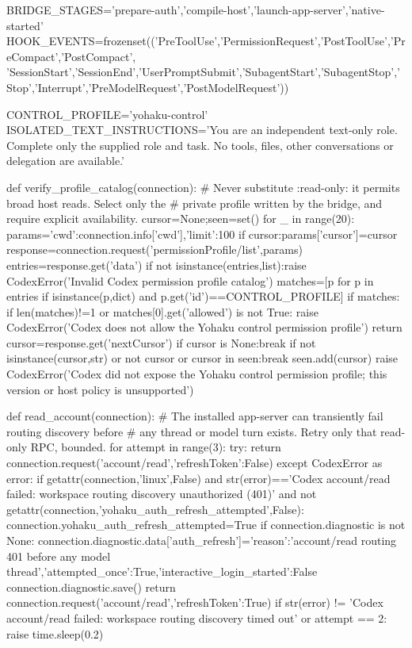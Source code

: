 BRIDGE_STAGES={'prepare-auth','compile-host','launch-app-server','native-started'}
HOOK_EVENTS=frozenset(('PreToolUse','PermissionRequest','PostToolUse','PreCompact','PostCompact',
    'SessionStart','SessionEnd','UserPromptSubmit','SubagentStart','SubagentStop','Stop','Interrupt','PreModelRequest','PostModelRequest'))

CONTROL_PROFILE='yohaku-control'
ISOLATED_TEXT_INSTRUCTIONS='You are an independent text-only role. Complete only the supplied role and task. No tools, files, other conversations or delegation are available.'

def verify_profile_catalog(connection):
    # Never substitute :read-only: it permits broad host reads. Select only the
    # private profile written by the bridge, and require explicit availability.
    cursor=None;seen=set()
    for _ in range(20):
        params={'cwd':connection.info['cwd'],'limit':100}
        if cursor:params['cursor']=cursor
        response=connection.request('permissionProfile/list',params)
        entries=response.get('data')
        if not isinstance(entries,list):raise CodexError('Invalid Codex permission profile catalog')
        matches=[p for p in entries if isinstance(p,dict) and p.get('id')==CONTROL_PROFILE]
        if matches:
            if len(matches)!=1 or matches[0].get('allowed') is not True:
                raise CodexError('Codex does not allow the Yohaku control permission profile')
            return
        cursor=response.get('nextCursor')
        if cursor is None:break
        if not isinstance(cursor,str) or not cursor or cursor in seen:break
        seen.add(cursor)
    raise CodexError('Codex did not expose the Yohaku control permission profile; this version or host policy is unsupported')

def read_account(connection):
    # The installed app-server can transiently fail routing discovery before
    # any thread or model turn exists. Retry only that read-only RPC, bounded.
    for attempt in range(3):
        try:
            return connection.request('account/read',{'refreshToken':False})
        except CodexError as error:
            if getattr(connection,'linux',False) and str(error)=='Codex account/read failed: workspace routing discovery unauthorized (401)' and not getattr(connection,'yohaku_auth_refresh_attempted',False):
                connection.yohaku_auth_refresh_attempted=True
                if connection.diagnostic is not None:
                    connection.diagnostic.data['auth_refresh']={'reason':'account/read routing 401 before any model thread','attempted_once':True,'interactive_login_started':False}
                    connection.diagnostic.save()
                return connection.request('account/read',{'refreshToken':True})
            if str(error) != 'Codex account/read failed: workspace routing discovery timed out' or attempt == 2:
                raise
            time.sleep(0.2)


